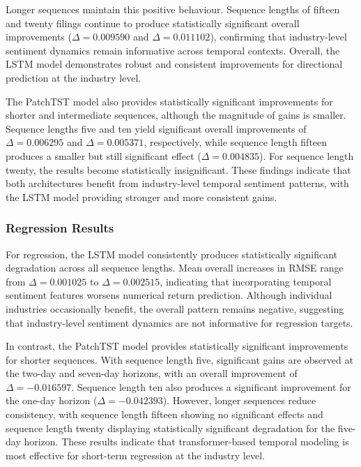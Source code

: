 Longer sequences maintain this positive behaviour. Sequence lengths of fifteen and twenty filings continue to produce statistically significant overall improvements ($\Delta = 0.009590$ and $\Delta = 0.011102$), confirming that industry-level sentiment dynamics remain informative across temporal contexts. Overall, the LSTM model demonstrates robust and consistent improvements for directional prediction at the industry level.

The PatchTST model also provides statistically significant improvements for shorter and intermediate sequences, although the magnitude of gains is smaller. Sequence lengths five and ten yield significant overall improvements of $\Delta = 0.006295$ and $\Delta = 0.005371$, respectively, while sequence length fifteen produces a smaller but still significant effect ($\Delta = 0.004835$). For sequence length twenty, the results become statistically insignificant. These findings indicate that both architectures benefit from industry-level temporal sentiment patterns, with the LSTM model providing stronger and more consistent gains.

\subsubsection{Regression Results}

For regression, the LSTM model consistently produces statistically significant degradation across all sequence lengths. Mean overall increases in RMSE range from $\Delta = 0.001025$ to $\Delta = 0.002515$, indicating that incorporating temporal sentiment features worsens numerical return prediction. Although individual industries occasionally benefit, the overall pattern remains negative, suggesting that industry-level sentiment dynamics are not informative for regression targets.

In contrast, the PatchTST model provides statistically significant improvements for shorter sequences. With sequence length five, significant gains are observed at the two-day and seven-day horizons, with an overall improvement of $\Delta = -0.016597$. Sequence length ten also produces a significant improvement for the one-day horizon ($\Delta = -0.042393$). However, longer sequences reduce consistency, with sequence length fifteen showing no significant effects and sequence length twenty displaying statistically significant degradation for the five-day horizon. These results indicate that transformer-based temporal modeling is most effective for short-term regression at the industry level.

